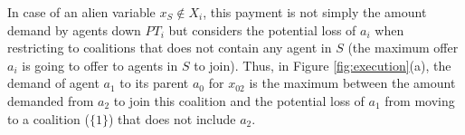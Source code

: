 \documentclass[11pt, twoside, titlepage, a4paper, openright]{report}
\begin{document}
\newpage\noindent In case of an alien variable $x_S\not\in X_i$, this payment is not simply the
amount demand by agents down $PT_i$ but considers the potential loss of $a_i$
when restricting to coalitions that does not contain any agent in $S$ (the
maximum offer $a_i$ is going to offer to agents in $S$ to join).
Thus, in Figure \ref{fig:execution}(a), the demand of agent $a_1$ to its parent
$a_0$ for $x_{02}$ is the maximum between the amount demanded from $a_2$ to join
this coalition and the potential loss of $a_1$ from moving to a coalition
($\{1\}$) that does not include $a_2$.
\end{document}
